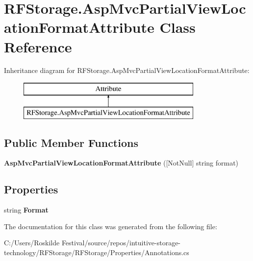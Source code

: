 \section{R\+F\+Storage.\+Asp\+Mvc\+Partial\+View\+Location\+Format\+Attribute Class Reference}
\label{class_r_f_storage_1_1_asp_mvc_partial_view_location_format_attribute}
Inheritance diagram for R\+F\+Storage.\+Asp\+Mvc\+Partial\+View\+Location\+Format\+Attribute\+:\begin{figure}[H]
\begin{center}
\leavevmode
\includegraphics[height=2.000000cm]{class_r_f_storage_1_1_asp_mvc_partial_view_location_format_attribute}
\end{center}
\end{figure}
\subsection*{Public Member Functions}
\begin{DoxyCompactItemize}
\item 
\mbox{\label{class_r_f_storage_1_1_asp_mvc_partial_view_location_format_attribute_a42254acedf0350de41349b8ec934d10d}} 
{\bfseries Asp\+Mvc\+Partial\+View\+Location\+Format\+Attribute} ([Not\+Null] string format)
\end{DoxyCompactItemize}
\subsection*{Properties}
\begin{DoxyCompactItemize}
\item 
\mbox{\label{class_r_f_storage_1_1_asp_mvc_partial_view_location_format_attribute_a4e08f53a559ba49a213231e359d60b9e}} 
string {\bfseries Format}\hspace{0.3cm}{\ttfamily  [get]}
\end{DoxyCompactItemize}


The documentation for this class was generated from the following file\+:\begin{DoxyCompactItemize}
\item 
C\+:/\+Users/\+Roskilde Festival/source/repos/intuitive-\/storage-\/technology/\+R\+F\+Storage/\+R\+F\+Storage/\+Properties/Annotations.\+cs\end{DoxyCompactItemize}
